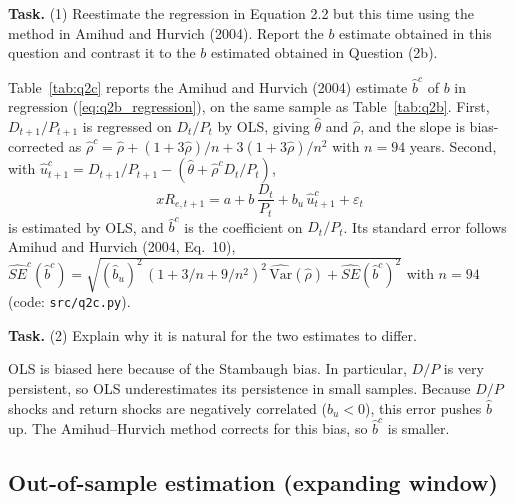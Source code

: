 \documentclass[11pt]{article}
\makeatletter
\newcommand{\Var}{\mathrm{Var}}
\newcommand{\xR}{\mathit{xR}}
\newcommand{\task}[1]{\par\if@nobreak\else\needspace{5\baselineskip}\fi\medskip\noindent
  \begin{minipage}{\linewidth}\textbf{Task.} #1\end{minipage}\par   %
  \nopagebreak\medskip\@afterheading}   %
\makeatother
\begin{document}
\task{(1) Reestimate the regression in Equation 2.2 but this time using the method in Amihud
and Hurvich (2004). Report the $b$ estimate obtained in this question and contrast it to the
$b$ estimated obtained in Question (2b).}

Table~\ref{tab:q2c} reports the Amihud and Hurvich (2004) estimate $\hat b^c$ of $b$ in
regression (\ref{eq:q2b_regression}), on the same sample as Table~\ref{tab:q2b}. First,
$D_{t+1}/P_{t+1}$ is regressed on $D_t/P_t$ by OLS, giving $\hat\theta$ and $\hat\rho$, and the
slope is bias-corrected as
$\hat\rho^c = \hat\rho + (1 + 3\hat\rho)/n + 3(1 + 3\hat\rho)/n^2$ with $n = 94$ years.
Second, with $\hat u^c_{t+1} = D_{t+1}/P_{t+1} - (\hat\theta + \hat\rho^c D_t/P_t)$,
\begin{equation}
  \xR_{e,t+1} = a + b\,\frac{D_t}{P_t} + b_u\,\hat u^c_{t+1} + \varepsilon_t
  \label{eq:q2c_regression}
\end{equation}
is estimated by OLS, and $\hat b^c$ is the coefficient on $D_t/P_t$. Its standard error follows
Amihud and Hurvich (2004, Eq.~10),
$\widehat{SE}^c(\hat b^c) = \sqrt{(\hat b_u)^2 \,(1 + 3/n + 9/n^2)^2\, \widehat{\Var}(\hat\rho)
+ \widehat{SE}(\hat b^c)^2}$ with $n = 94$ (code: \texttt{src/q2c.py}).

\begin{table}[H]
  \centering
  
  \caption{Amihud and Hurvich (2004) estimate of $b$ in regression (\ref{eq:q2b_regression})
  via the augmented regression (\ref{eq:q2c_regression}). In row (i-a), $\widehat{\Var}(\hat\rho)$
  and $\widehat{SE}(\hat b^c)$ are plain OLS estimates; in row (i-b), both are Newey--West (1987)
  estimates with 11 lags. Predictor dates 1927:12--2020:12.}
  \label{tab:q2c}
\end{table}

\task{(2) Explain why it is natural for the two estimates to differ.}

OLS is biased here because of the Stambaugh bias. In particular, $D/P$ is very persistent, so
OLS underestimates its persistence in small samples. Because $D/P$ shocks and return shocks are
negatively correlated ($\hat b_u < 0$), this error pushes $\hat b$ up. The Amihud--Hurvich
method corrects for this bias, so $\hat b^c$ is smaller.


\subsection{Out-of-sample estimation (expanding window)}
\end{document}
